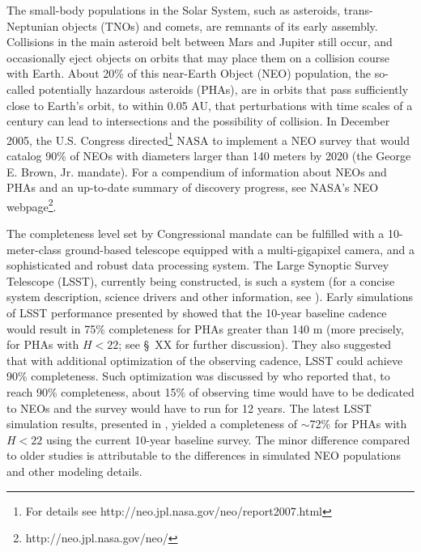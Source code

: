 \documentclass[12pt,preprint]{aastex}
\begin{document}
The small-body populations in the Solar System, such as asteroids, trans-Neptunian objects (TNOs) 
and comets, are remnants of its early assembly. Collisions in the main asteroid belt between Mars and 
Jupiter still occur, and occasionally eject objects on orbits that may place them on a collision course 
with Earth. About 20\% of this near-Earth Object (NEO) population, the so-called potentially hazardous 
asteroids (PHAs), are in orbits that pass sufficiently close to Earth's orbit, to within 0.05 AU, that 
perturbations with time scales of a century can lead to intersections and the possibility of collision. 
In December 2005, the U.S. Congress directed\footnote{For details see http://neo.jpl.nasa.gov/neo/report2007.html} 
NASA to implement a NEO survey that would catalog 90\% of NEOs with diameters larger than 140 meters 
by 2020 (the George E. Brown, Jr. mandate). For a compendium of information about NEOs and PHAs 
and an up-to-date summary of discovery progress, see NASA's NEO webpage\footnote{http://neo.jpl.nasa.gov/neo/}. 

The completeness level set by Congressional mandate can be fulfilled with a 10-meter-class ground-based
telescope equipped with a multi-gigapixel camera, and a sophisticated and robust data processing system. 
The Large Synoptic Survey Telescope (LSST), currently being constructed, is such a system (for a concise
system description, science drivers and other information, see \citep{LSSToverview}). Early simulations of 
LSST performance presented by \cite{IvezicNEO2007} showed that the 10-year baseline cadence would 
result in 75\% completeness for PHAs greater than 140 m (more precisely, for PHAs with $H<22$; see 
\S~XX for further discussion). They also suggested that with additional optimization of the observing cadence, 
LSST could achieve 90\% completeness. Such optimization was discussed by \cite{LSSToverview} who
reported that, to reach 90\% completeness, about 15\% of observing time would have to be dedicated to NEOs
and the survey would have to run for 12 years.  
The latest LSST simulation results, presented in \cite{JJI2016}, yielded a completeness of $\sim$72\% for
PHAs with $H<22$ using the current 10-year baseline survey. The minor difference compared to older
studies is attributable to the differences in simulated NEO populations and other modeling details. 
\end{document}
